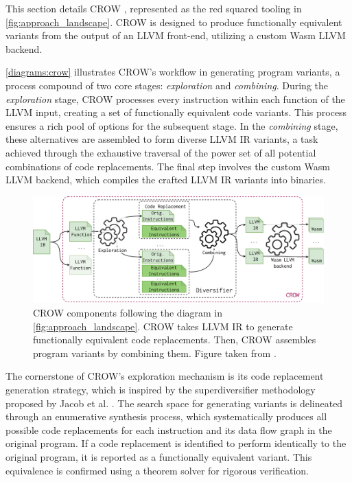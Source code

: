 
\label{section:crow}
\renewcommand{\tool}{CROW\xspace}

This section details CROW \cite{CROW}, represented as the red squared tooling in \autoref{fig:approach_landscape}. 
CROW is designed to produce functionally equivalent \wasm variants from the output of an LLVM front-end, utilizing a custom Wasm LLVM backend.

\autoref{diagrams:crow} illustrates CROW's workflow in generating program variants, a process compound of two core stages: \textit{exploration} and \textit{combining}. 
During the \textit{exploration} stage, CROW processes every instruction within each function of the LLVM input, creating a set of functionally equivalent code variants. 
This process ensures a rich pool of options for the subsequent stage.
In the \textit{combining} stage, these alternatives are assembled to form diverse LLVM IR variants, a task achieved through the exhaustive traversal of the power set of all potential combinations of code replacements. 
The final step involves the custom Wasm LLVM backend, which compiles the crafted LLVM IR variants into \wasm binaries. 


\begin{figure}[h]
    \includegraphics[width=\linewidth]{diagrams/generation/crow.drawio.pdf}
    \caption{CROW components following the diagram in \autoref{fig:approach_landscape}. CROW takes LLVM IR to generate functionally equivalent code replacements. Then, CROW assembles program variants by combining them. Figure taken from \cite{Lic}.}
    \label{diagrams:crow}
\end{figure}



The cornerstone of CROW's exploration mechanism is its code replacement generation strategy, which is inspired by the superdiversifier methodology proposed by Jacob et al. \cite{jacob2008superdiversifier}. 
The search space for generating variants is delineated through an enumerative synthesis process, which systematically produces all possible code replacements for each instruction and its data flow graph in the original program. 
If a code replacement is identified to perform identically to the original program, it is reported as a functionally equivalent variant.
This equivalence is confirmed using a theorem solver for rigorous verification.

